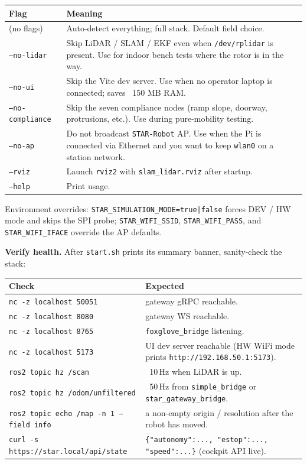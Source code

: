 \begin{center}
\begin{tabular}{|p{3.3cm}|p{11.5cm}|}
\hline
\textbf{Flag} & \textbf{Meaning} \\
\hline
(no flags) & Auto-detect everything; full stack. Default field choice. \\
\hline
\texttt{--no-lidar} & Skip LiDAR / SLAM / EKF even when \texttt{/dev/rplidar} is present. Use for indoor bench tests where the rotor is in the way. \\
\hline
\texttt{--no-ui} & Skip the Vite dev server. Use when no operator laptop is connected; saves ~150 MB RAM. \\
\hline
\texttt{--no-compliance} & Skip the seven compliance nodes (ramp slope, doorway, protrusions, etc.). Use during pure-mobility testing. \\
\hline
\texttt{--no-ap} & Do not broadcast \texttt{STAR-Robot} AP. Use when the Pi is connected via Ethernet and you want to keep \texttt{wlan0} on a station network. \\
\hline
\texttt{--rviz} & Launch \texttt{rviz2} with \texttt{slam\_lidar.rviz} after startup. \\
\hline
\texttt{--help} & Print usage. \\
\hline
\end{tabular}
\end{center}

Environment overrides:
\texttt{STAR\_SIMULATION\_MODE=true|false} forces DEV / HW mode and
skips the SPI probe; \texttt{STAR\_WIFI\_SSID},
\texttt{STAR\_WIFI\_PASS}, and \texttt{STAR\_WIFI\_IFACE} override the
AP defaults.

\textbf{Verify health.} After \texttt{start.sh} prints its summary
banner, sanity-check the stack:

\begin{center}
\begin{tabular}{|p{4.4cm}|p{10.4cm}|}
\hline
\textbf{Check} & \textbf{Expected} \\
\hline
\texttt{nc -z localhost 50051} & gateway gRPC reachable. \\
\hline
\texttt{nc -z localhost 8080}  & gateway WS reachable. \\
\hline
\texttt{nc -z localhost 8765}  & \texttt{foxglove\_bridge} listening. \\
\hline
\texttt{nc -z localhost 5173}  & UI dev server reachable (HW WiFi mode prints \texttt{http://192.168.50.1:5173}). \\
\hline
\texttt{ros2 topic hz /scan}   & ~10\,Hz when LiDAR is up. \\
\hline
\texttt{ros2 topic hz /odom/unfiltered} & ~50\,Hz from \texttt{simple\_bridge} or \texttt{star\_gateway\_bridge}. \\
\hline
\texttt{ros2 topic echo /map -n 1 --field info} & a non-empty origin / resolution after the robot has moved. \\
\hline
\texttt{curl -s https://star.local/api/state} & \texttt{\{"autonomy":..., "estop":..., "speed":...\}} (cockpit API live). \\
\hline
\end{tabular}
\end{center}

